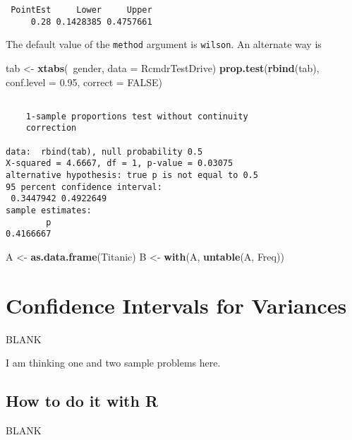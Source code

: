\documentclass[]{book}
\newenvironment{Shaded}{\begin{snugshade}}{\end{snugshade}}
\newcommand{\KeywordTok}[1]{\textcolor[rgb]{0.13,0.29,0.53}{\textbf{{#1}}}}
\newcommand{\DataTypeTok}[1]{\textcolor[rgb]{0.13,0.29,0.53}{{#1}}}
\newcommand{\FloatTok}[1]{\textcolor[rgb]{0.00,0.00,0.81}{{#1}}}
\newcommand{\StringTok}[1]{\textcolor[rgb]{0.31,0.60,0.02}{{#1}}}
\newcommand{\OtherTok}[1]{\textcolor[rgb]{0.56,0.35,0.01}{{#1}}}
\newcommand{\NormalTok}[1]{{#1}}
\numberwithin{equation}{chapter}
\numberwithin{figure}{chapter}
\theoremstyle{plain}
\theoremstyle{definition}
\theoremstyle{remark}
\theoremstyle{definition}
\theoremstyle{definition}
\theoremstyle{remark}
\begin{document}
\begin{verbatim}
 PointEst     Lower     Upper
     0.28 0.1428385 0.4757661
\end{verbatim}

The default value of the \texttt{method} argument is \texttt{wilson}. An
alternate way is

\begin{Shaded}
\begin{Highlighting}[]
\NormalTok{tab <-}\StringTok{ }\KeywordTok{xtabs}\NormalTok{(~gender, }\DataTypeTok{data =} \NormalTok{RcmdrTestDrive)}
\KeywordTok{prop.test}\NormalTok{(}\KeywordTok{rbind}\NormalTok{(tab), }\DataTypeTok{conf.level =} \FloatTok{0.95}\NormalTok{, }\DataTypeTok{correct =} \OtherTok{FALSE}\NormalTok{)}
\end{Highlighting}
\end{Shaded}

\begin{verbatim}

    1-sample proportions test without continuity
    correction

data:  rbind(tab), null probability 0.5
X-squared = 4.6667, df = 1, p-value = 0.03075
alternative hypothesis: true p is not equal to 0.5
95 percent confidence interval:
 0.3447942 0.4922649
sample estimates:
        p 
0.4166667 
\end{verbatim}

\begin{Shaded}
\begin{Highlighting}[]
\NormalTok{A <-}\StringTok{ }\KeywordTok{as.data.frame}\NormalTok{(Titanic)}
\NormalTok{B <-}\StringTok{ }\KeywordTok{with}\NormalTok{(A, }\KeywordTok{untable}\NormalTok{(A, Freq))}
\end{Highlighting}
\end{Shaded}

\section{Confidence Intervals for
Variances}\label{sec-confidence-intervals-for-variances}

BLANK

I am thinking one and two sample problems here.

\subsection{How to do it with R}\label{how-to-do-it-with-r-36}

BLANK
\end{document}
